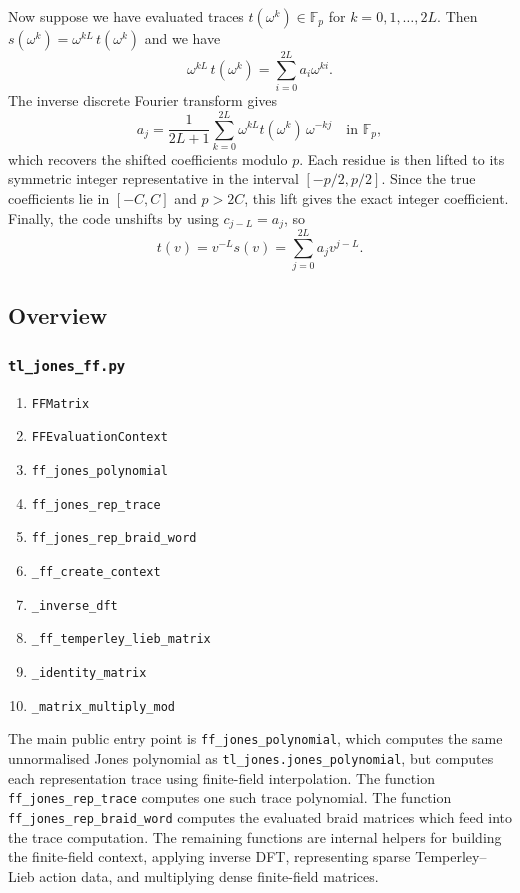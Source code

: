 \documentclass[10pt]{article}
\begin{document}
Now suppose we have evaluated traces $t(\omega^k) \in\mathbb{F}_p$ for $k=0,1,\ldots,2L$. Then $s(\omega^k)=\omega^{kL}\, t(\omega^k)$ and we have
\[
\omega^{kL}\, t(\omega^k) = \sum_{i=0}^{2L} a_i\omega^{ki}.
\]
The inverse discrete Fourier transform gives
\[
a_j
=\frac{1}{2L+1}\sum_{k=0}^{2L}
\omega^{kL}t(\omega^k)\,\omega^{-kj}
\quad\text{in }\mathbb{F}_p,
\]
which recovers the shifted coefficients modulo \(p\). Each residue is then lifted to its symmetric integer representative in the interval \([-p/2,p/2]\). Since the true coefficients lie in \([-C,C]\) and \(p>2C\), this lift gives the exact integer coefficient. Finally, the code unshifts by using \(c_{j-L}=a_j\), so
\[
t(v)=v^{-L}s(v)=\sum_{j=0}^{2L} a_j v^{j-L}.
\]


\newpage
\subsection*{Overview}


\subsubsection*{\texttt{tl\_jones\_ff.py}}
\begin{enumerate}
  \item \texttt{FFMatrix}
  \item \texttt{FFEvaluationContext}
  \item \texttt{ff\_jones\_polynomial}
  \item \texttt{ff\_jones\_rep\_trace}
  \item \texttt{ff\_jones\_rep\_braid\_word}
  \item \texttt{\_ff\_create\_context}
  \item \texttt{\_inverse\_dft}
  \item \texttt{\_ff\_temperley\_lieb\_matrix}
  \item \texttt{\_identity\_matrix}
  \item \texttt{\_matrix\_multiply\_mod}
\end{enumerate}

The main public entry point is \texttt{ff\_jones\_polynomial}, which computes the same unnormalised Jones polynomial as \texttt{tl\_jones.jones\_polynomial}, but computes each representation trace using finite-field interpolation.
The function \texttt{ff\_jones\_rep\_trace} computes one such trace polynomial.
The function \texttt{ff\_jones\_rep\_braid\_word} computes the evaluated braid matrices which feed into the trace computation.
The remaining functions are internal helpers for building the finite-field context, applying inverse DFT, representing sparse Temperley--Lieb action data, and multiplying dense finite-field matrices.
\end{document}
